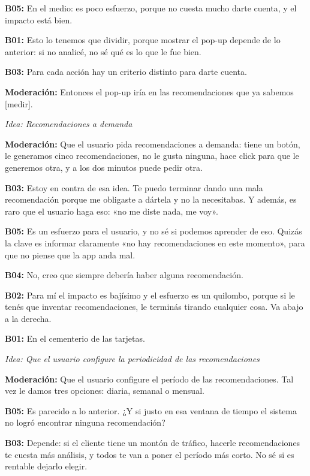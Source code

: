 \noindent\textbf{B05:} En el medio: es poco esfuerzo, porque no cuesta mucho darte cuenta, y el impacto está bien.

\noindent\textbf{B01:} Esto lo tenemos que dividir, porque mostrar el pop-up depende de lo anterior: si no analicé, no sé qué es lo que le fue bien.

\noindent\textbf{B03:} Para cada acción hay un criterio distinto para darte cuenta.

\noindent\textbf{Moderación:} Entonces el pop-up iría en las recomendaciones que ya sabemos [medir].

\medskip\noindent\textit{Idea: Recomendaciones a demanda}

\noindent\textbf{Moderación:} Que el usuario pida recomendaciones a demanda: tiene un botón, le generamos cinco recomendaciones, no le gusta ninguna, hace click para que le generemos otra, y a los dos minutos puede pedir otra.

\noindent\textbf{B03:} Estoy en contra de esa idea. Te puedo terminar dando una mala recomendación porque me obligaste a dártela y no la necesitabas. Y además, es raro que el usuario haga eso: «no me diste nada, me voy».

\noindent\textbf{B05:} Es un esfuerzo para el usuario, y no sé si podemos aprender de eso. Quizás la clave es informar claramente «no hay recomendaciones en este momento», para que no piense que la app anda mal.

\noindent\textbf{B04:} No, creo que siempre debería haber alguna recomendación.

\noindent\textbf{B02:} Para mí el impacto es bajísimo y el esfuerzo es un quilombo, porque si le tenés que inventar recomendaciones, le terminás tirando cualquier cosa. Va abajo a la derecha.

\noindent\textbf{B01:} En el cementerio de las tarjetas.

\medskip\noindent\textit{Idea: Que el usuario configure la periodicidad de las recomendaciones}

\noindent\textbf{Moderación:} Que el usuario configure el período de las recomendaciones. Tal vez le damos tres opciones: diaria, semanal o mensual.

\noindent\textbf{B05:} Es parecido a lo anterior. ¿Y si justo en esa ventana de tiempo el sistema no logró encontrar ninguna recomendación?

\noindent\textbf{B03:} Depende: si el cliente tiene un montón de tráfico, hacerle recomendaciones te cuesta más análisis, y todos te van a poner el período más corto. No sé si es rentable dejarlo elegir.


